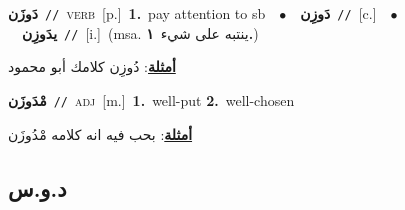 \documentclass[10pt,a4paper,twoside]{article} %
\begin{document}
\begin{multicols}{2}
{\setlength\topsep{0pt}\textbf{\foreignlanguage{arabic}{دَوزَن}}\ {\color{gray}\texttt{//}\color{black}}\ \textsc{verb}\ [p.]\ \textbf{1.}~pay attention to sb\ \ $\bullet$\ \ \setlength\topsep{0pt}\textbf{\foreignlanguage{arabic}{دَوزِن}}\ {\color{gray}\texttt{//}\color{black}}\ [c.]\ \ $\bullet$\ \ \setlength\topsep{0pt}\textbf{\foreignlanguage{arabic}{يدَوزِن}}\ {\color{gray}\texttt{//}\color{black}}\ [i.]\ \color{gray}(msa. \foreignlanguage{arabic}{ينتبه على شيء}~\foreignlanguage{arabic}{\textbf{١.}})\color{black}\  \begin{flushright}\color{gray}\foreignlanguage{arabic}{\textbf{\underline{\foreignlanguage{arabic}{أمثلة}}}: دُوزِن كلامك أبو محمود}\end{flushright}\color{black}} \vspace{2mm}

{\setlength\topsep{0pt}\textbf{\foreignlanguage{arabic}{مْدَوزَن}}\ {\color{gray}\texttt{//}\color{black}}\ \textsc{adj}\ [m.]\ \textbf{1.}~well-put  \textbf{2.}~well-chosen\  \begin{flushright}\color{gray}\foreignlanguage{arabic}{\textbf{\underline{\foreignlanguage{arabic}{أمثلة}}}: بحب فيه انه كلامه مْدُوزَن}\end{flushright}\color{black}} \vspace{2mm}

\vspace{-3mm}
\subsection*{\color{blue}\foreignlanguage{arabic}{د.و.س}\color{blue}{}} 


\end{multicols}
\end{document}
